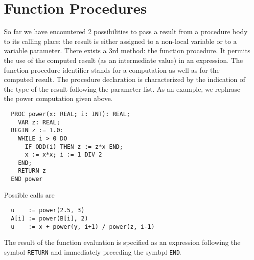 \chapter{Function Procedures}
So far we have encountered 2 possibilities to pass a result from a procedure body to its calling
place: the result is either assigned to a non-local variable or to a variable parameter. There
exists a 3rd method: the function procedure. It permits the use of the computed result (as an
intermediate value) in an expression. The function procedure identifier stands for a computation
as well as for the computed result. The procedure declaration is characterized by the indication
of the type of the result following the parameter list. As an example, we rephrase the power
computation given above.
\begin{verbatim}
  PROC power(x: REAL; i: INT): REAL;
    VAR z: REAL;
  BEGIN z := 1.0:
    WHILE i > 0 DO
      IF ODD(i) THEN z := z*x END;
      x := x*x; i := 1 DIV 2
    END;
    RETURN z
  END power
\end{verbatim}
Possible calls are
\begin{verbatim}
  u    := power(2.5, 3)
  A[i] := power(B[i], 2)
  u    := x + power(y, i+1) / power(z, i-1)
\end{verbatim}
The result of the function evaluation is specified as an expression following the symbol
\verb|RETURN| and immediately preceding the symbpl \verb|END|.

